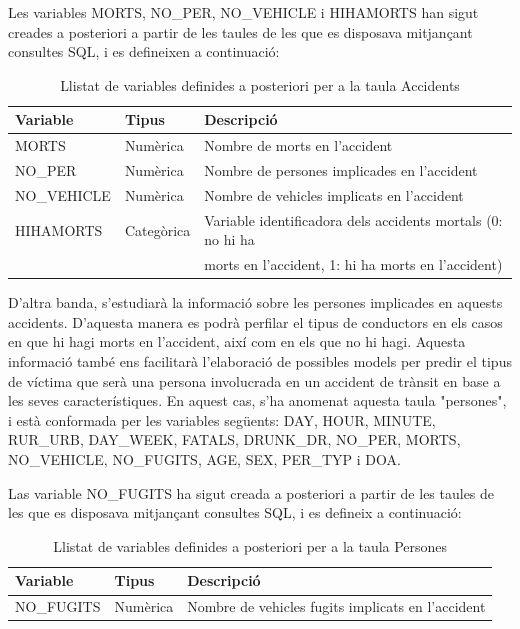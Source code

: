 \documentclass[12pt,longbibliography]{article}
\theoremstyle{definition}
\theoremstyle{remark}
\begin{document}
Les variables MORTS, NO\_PER, NO\_VEHICLE i HIHAMORTS han sigut creades a posteriori a partir de les taules de les que es disposava mitjançant consultes SQL, i es defineixen a continuació:


\begin{table}[H]
\centering
\begin{tabular}{|l|l|l|}
\hline
\textbf{Variable} & \textbf{Tipus} & \textbf{Descripció}                         \\ \hline
MORTS             & Numèrica       & Nombre de morts en l'accident               \\
NO\_PER           & Numèrica       & Nombre de persones implicades en l'accident \\
NO\_VEHICLE       & Numèrica       & Nombre de vehicles implicats en l'accident  \\
HIHAMORTS & Categòrica & Variable identificadora dels accidents mortals (0: no hi ha \\
                       &                   &  morts en l'accident, 1: hi ha morts en l'accident) \\ \hline
\end{tabular}
\caption{Llistat de variables definides a posteriori per a la taula Accidents}
\end{table}

D'altra banda, s'estudiarà la informació sobre les persones implicades en aquests accidents. D'aquesta manera es podrà perfilar el tipus de conductors en els casos en que hi hagi morts en l'accident, així com en els que no hi hagi. Aquesta informació també ens facilitarà l'elaboració de possibles models per predir el tipus de víctima que serà una persona involucrada en un accident de trànsit en base a les seves característiques. En aquest cas, s'ha anomenat aquesta taula "persones", i està conformada per les variables següents: DAY, HOUR, MINUTE, RUR\_URB, DAY\_WEEK, FATALS, DRUNK\_DR, NO\_PER, MORTS, NO\_VEHICLE, NO\_FUGITS, AGE, SEX, PER\_TYP i DOA.


Las variable NO\_FUGITS ha sigut creada a posteriori a partir de les taules de les que es disposava mitjançant consultes SQL, i es defineix a continuació:


\begin{table}[H]
\centering
\begin{tabular}{|l|l|l|}
\hline
\textbf{Variable} & \textbf{Tipus} & \textbf{Descripció}                         \\ \hline
NO\_FUGITS     &   Numèrica    &  Nombre de vehicles fugits implicats en l'accident \\ \hline
\end{tabular}
\caption{Llistat de variables definides a posteriori per a la taula Persones}
\end{table}
\end{document}
